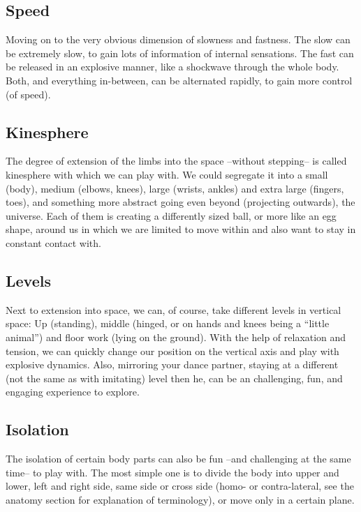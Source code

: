 \subsection{Speed}\label{subsec:speed}
Moving on to the very obvious dimension of slowness and fastness.
The slow can be extremely slow, to gain lots of information of internal sensations.
The fast can be released in an explosive manner, like a shockwave through the whole body.
Both, and everything in-between, can be alternated rapidly, to gain more control (of speed).

\subsection{Kinesphere}\label{subsec:kinesphere}
The degree of extension of the limbs into the space --without stepping-- is called \gls{kinesphere} with which we can play with.
We could segregate it into a small (body), medium (elbows, knees), large (wrists, ankles) and extra large (fingers, toes), and something more abstract going even beyond (projecting outwards), the universe.
Each of them is creating a differently sized ball, or more like an egg shape, around us in which we are limited to move within and also want to stay in constant contact with.

\subsection{Levels}\label{subsec:levels}
Next to extension into space, we can, of course, take different levels in vertical space: Up (standing), middle (hinged, or on hands and knees being a ``little animal'') and floor work (lying on the ground).
With the help of relaxation and tension, we can quickly change our position on the vertical axis and play with explosive dynamics.
Also, mirroring your dance partner, staying at a different (not the same as with imitating) level then he, can be an challenging, fun, and engaging experience to explore.

\subsection{Isolation}\label{subsec:isolation}
The isolation of certain body parts can also be fun --and challenging at the same time-- to play with.
The most simple one is to divide the body into upper and lower, left and right side, same side or cross side (homo- or contra-lateral, see the anatomy section for explanation of terminology), or move only in a certain plane.

